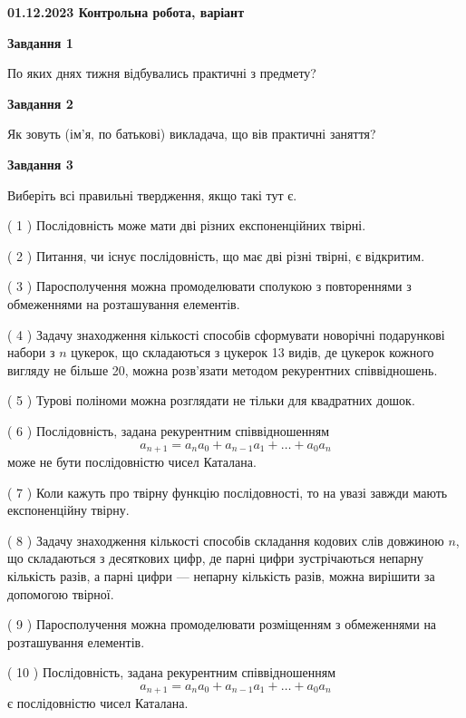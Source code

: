 \documentclass[12pt, ukrainian]{article}
\begin{document}
\begin {large}

\textbf{01.12.2023 Контрольна робота, варіант  }\par


{
{\begin {center}\textbf{Завдання 1}\end {center}}\par
По яких днях тижня відбувались практичні з предмету?\par
{\begin {center}\textbf{Завдання 2}\end {center}}\par
Як зовуть (ім'я, по батькові) викладача, що вів практичні заняття?\par
{\begin {center}\textbf{Завдання 3}\end {center}}\par
Виберіть всі правильні твердження, якщо такі тут є.\par
\vspace{2mm}
( 1 ) Послідовність може мати дві різних експоненційних твірні.%

( 2 ) Питання, чи існує послідовність, що має дві різні твірні, є відкритим.%

( 3 ) Паросполучення можна промоделювати сполукою з повтореннями з обмеженнями на розташування елементів.%

( 4 ) Задачу знаходження кількості способів сформувати новорічні подарункові набори з $n$ цукерок, що складаються з цукерок 13 видів, де цукерок кожного вигляду не більше 20, можна розв’язати методом рекурентних співвідношень.%

( 5 ) Турові поліноми можна розглядати не тільки для квадратних дошок.%

( 6 ) Послідовність, задана рекурентним співвідношенням $$a_{n+1}=a_{n}a_{0}+a_{n-1}a_{1}+\ldots+a_0a_{n}$$ може не бути послідовністю чисел Каталана.%

( 7 ) Коли кажуть про твірну функцію послідовності, то на увазі завжди мають експоненційну твірну.%

( 8 ) Задачу знаходження кількості способів складання кодових слів довжиною $n$, що складаються з десяткових цифр, де парні цифри зустрічаються непарну кількість разів, а парні цифри — непарну кількість разів, можна вирішити за допомогою твірної.%

( 9 ) Паросполучення можна промоделювати розміщенням з обмеженнями на розташування елементів.%

( 10 ) Послідовність, задана рекурентним співвідношенням $$a_{n+1}=a_{n}a_{0}+a_{n-1}a_{1}+\ldots+a_0a_{n}$$ є послідовністю чисел Каталана.%
}
\end {large}

\vspace{4mm}
\newpage
\end{document}
